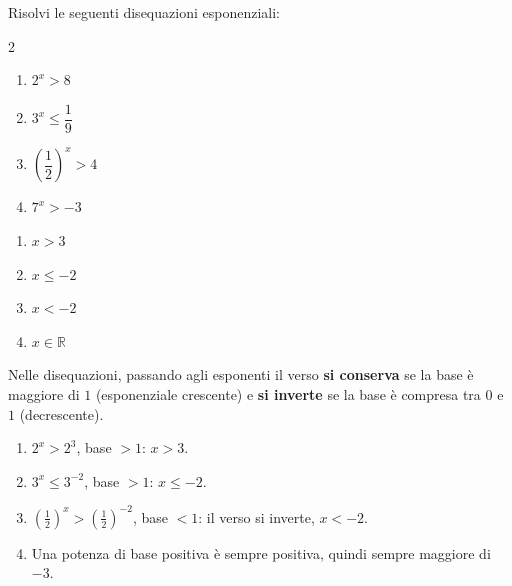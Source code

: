\begin{question}[ID=5.1, subtitle={Disequazioni esponenziali elementari}, difficulty=facile, tags={disequazioni, esponenziali}]
Risolvi le seguenti disequazioni esponenziali:
\begin{center}\begin{minipage}{0.92\linewidth}
\begin{multicols}{2}
\begin{enumerate}[leftmargin=3.2cm]
\item $2^{x} > 8$
\item $3^{x} \leq \dfrac{1}{9}$
\item $\left(\dfrac{1}{2}\right)^{x} > 4$
\item $7^{x} > -3$
\end{enumerate}
\end{multicols}
\end{minipage}\end{center}
\begin{solution}
\begin{enumerate}
    \item $x>3$
    \item $x\leq-2$
    \item $x<-2$
    \item $x\in\mathbb{R}$
\end{enumerate}
\end{solution}
\begin{explanation}
Nelle disequazioni, passando agli esponenti il verso \textbf{si conserva} se la base è maggiore di $1$ (esponenziale crescente) e \textbf{si inverte} se la base è compresa tra $0$ e $1$ (decrescente).
\begin{enumerate}
    \item $2^x>2^3$, base $>1$: $x>3$.
    \item $3^x\leq3^{-2}$, base $>1$: $x\leq-2$.
    \item $\left(\tfrac12\right)^x>\left(\tfrac12\right)^{-2}$, base $<1$: il verso si inverte, $x<-2$.
    \item Una potenza di base positiva è sempre positiva, quindi sempre maggiore di $-3$.
\end{enumerate}
\end{explanation}
\end{question}


